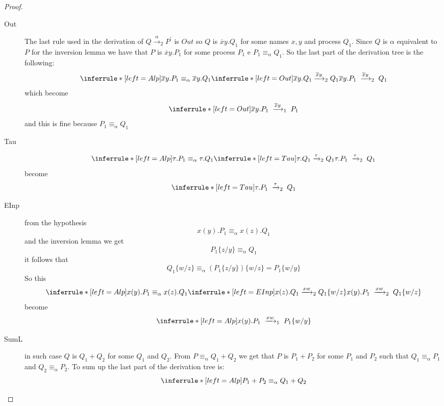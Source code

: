 \begin{proof}
\begin{description}
\begin{itemize}
	\begin{description}
	  \item[Out] 
	    The last rule used in the derivation of $Q\xrightarrow{\alpha}_{2}P^{'}$ is $Out$ so $Q$ is $\overline{x}y.Q_{1}$ for some names $x,y$ and process $Q_{1}$. Since $Q$ is $\alpha$ equivalent to $P$ for the inversion lemma we have that $P$ is $\overline{x}y.P_{1}$ for some process $P_{1}$ e $P_{1}\equiv_{\alpha}Q_{1}$. So the last part of the derivation tree is the following:
	    \[
	      \inferrule* [left=Alp]{
		  \overline{x}y.P_{1}\equiv_{\alpha}\overline{x}y.Q_{1}
		\\
		  \inferrule* [left=Out]{
		  }{
		    \overline{x}y.Q_{1}\xrightarrow{\overline{x}y}_{2}Q_{1}
		  }
	      }{
		\overline{x}y.P_{1}\; \xrightarrow{\overline{x}y}_{2}\; Q_{1}
	      }
	    \]
	    which become
	    \[
	      \inferrule* [left=Out]{
	      }{
		\overline{x}y.P_{1}\; \xrightarrow{\overline{x}y}_{1}\; P_{1}
	      }
	    \]
	    and this is fine because $P_{1}\equiv_{\alpha}Q_{1}$
	  \item[Tau]
	    \[
	      \inferrule* [left=Alp]{
		  \tau.P_{1}\equiv_{\alpha}\tau.Q_{1}
		\\
		  \inferrule* [left=Tau]{
		  }{
		    \tau.Q_{1}\xrightarrow{\tau}_{2}Q_{1}
		  }
	      }{
		\tau.P_{1}\; \xrightarrow{\tau}_{2}\; Q_{1}
	      }
	    \]
	    become
	    \[
	      \inferrule* [left=Tau]{
	      }{
		\tau.P_{1}\; \xrightarrow{\tau}_{2}\; Q_{1}
	      }
	    \]
	  \item[EInp]
	    from the hypothesis \[x(y).P_{1}\equiv_{\alpha}x(z).Q_{1}\] and the inversion lemma we get \[P_{1}\{z/y\}\equiv_{\alpha}Q_{1}\] it follows that \[Q_{1}\{w/z\}\equiv_{\alpha} (P_{1}\{z/y\})\{w/z\}=P_{1}\{w/y\}\]
	    So this
	    \[
	      \inferrule* [left=Alp]{
		  x(y).P_{1}\equiv_{\alpha}x(z).Q_{1}
		\\
		  \inferrule* [left=EInp]{
		  }{
		    x(z).Q_{1}\xrightarrow{x w}_{2}Q_{1}\{w/z\}
		  }
	      }{
		x(y).P_{1}\; \xrightarrow{xw}_{2}\; Q_{1}\{w/z\}
	      }
	    \]
	    become
	    \[
	      \inferrule* [left=Alp]{
	      }{
		x(y).P_{1}\; \xrightarrow{xw}_{1}\; P_{1}\{w/y\}
	      }
	    \]
	  \item[SumL] 
	    in such case $Q$ is $Q_{1}+Q_{2}$ for some $Q_{1}$ and $Q_{2}$. From $P\equiv_{\alpha} Q_{1}+Q_{2}$ we get that $P$ is $P_{1}+P_{2}$ for some $P_{1}$ and $P_{2}$ such that $Q_{1}\equiv_{\alpha}P_{1}$ and $Q_{2}\equiv_{\alpha}P_{2}$. To sum up the last part of the derivation tree is:
	    \[
	      \inferrule* [left=Alp]{
		  P_{1}+P_{2}\equiv_{\alpha}Q_{1}+Q_{2}
}\]
\end{description}
\end{itemize}
\end{description}
\end{proof}
